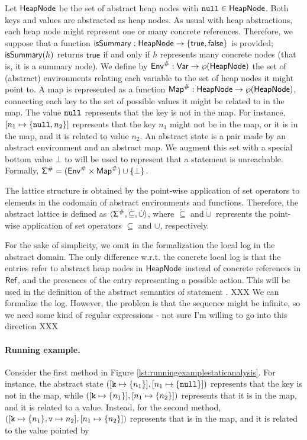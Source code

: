 Let $\mathsf{HeapNode}$ be the set of abstract heap nodes with $\mathtt{null} \in \mathsf{HeapNode}$. Both keys and values are abstracted as heap nodes. As usual with heap abstractions, each heap node might represent one or many concrete references. Therefore, we suppose that a function $\mathsf{isSummary} : \mathsf{HeapNode} \to \{\mathsf{true}, \mathsf{false}\}$ is provided; $\mathsf{isSummary}(h)$ returns $\mathsf{true}$ if and only if $h$ represents many concrete nodes (that is, it is a summary node). We define by $\mathsf{Env}^\# : \mathsf{Var} \to \wp(\mathsf{HeapNode})$ the set of (abstract) environments relating each variable to the set of heap nodes it might point to. A map is represented as a function $\mathsf{Map}^\# : \mathsf{HeapNode} \to \wp(\mathsf{HeapNode})$, connecting each key to the set of possible values it might be related to in the map. The value $\mathtt{null}$ represents that the key is not in the map. For instance, $[n_1 \mapsto \{\mathtt{null}, n_2\}]$ represents that the key $n_1$ might not be in the map, or it is in the map, and it is related to value $n_2$. An abstract state is a pair made by an abstract environment and an abstract map. We augment this set with a special bottom value $\bot$ to will be used to represent that a statement is unreachable. Formally, $\mathsf{\Sigma}^\# = (\mathsf{Env}^\# \times \mathsf{Map}^\#) \cup \{\bot\}$.

The lattice structure is obtained by the point-wise application of set operators to elements in the codomain of abstract environments and functions. Therefore, the abstract lattice is defined as $\langle \mathsf{\Sigma}^\#, \dot{\subseteq}, \dot{\cup} \rangle$, where $\dot{\subseteq}$ and$\dot{\cup}$ represents the point-wise application of set operators $\subseteq$ and $\cup$, respectively.

For the sake of simplicity, we omit in the formalization the local log in the abstract domain. The only difference w.r.t. the concrete local log is that the entries refer to abstract heap nodes in $\mathsf{HeapNode}$ instead of concrete references in $\mathsf{Ref}$, and the presences of the entry  representing a possible  action. This will be used in the definition of the abstract semantics of statement . XXX We can formalize the log. However, the problem is that the sequence might be infinite, so we need some kind of regular expressions - not sure I'm willing to go into this direction XXX 

\paragraph{Running example.} 
Consider the first method in Figure \ref{lst:runningexamplestaticanalysis}. For instance, the abstract state $([\mathtt{k} \mapsto \{n_1\}], [n_1 \mapsto \{\mathtt{null}\}])$ represents that the key  is not in the map, while $([\mathtt{k} \mapsto \{n_1\}], [n_1 \mapsto \{n_2\}])$ represents that it is in the map, and it is related to a value. Instead, for the second method, $([\mathtt{k} \mapsto \{n_1\}, \mathtt{v} \mapsto n_2], [n_1 \mapsto \{n_2\}])$ represents that  is in the map, and it is related to the value pointed by 

